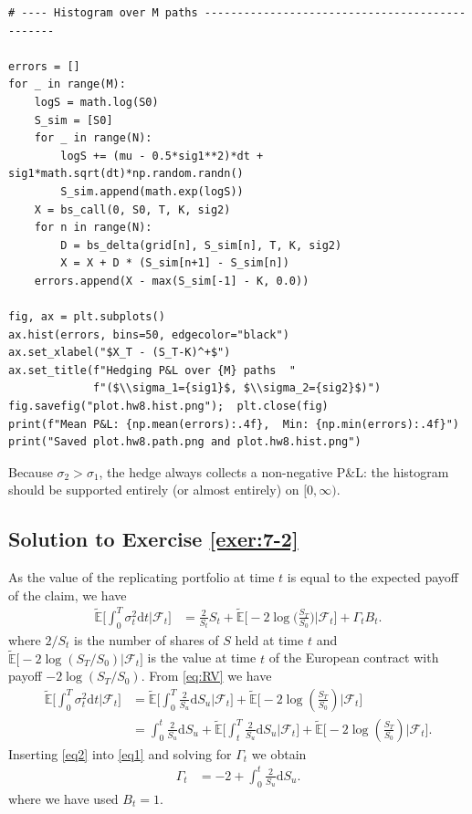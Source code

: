 \documentclass[12pt]{book}
\numberwithin{equation}{chapter}
\theoremstyle{plain}
\numberwithin{theorem}{section}
\theoremstyle{definition}
\numberwithin{exercise}{chapter}
\newcommand{\<}{\langle}
\renewcommand{\>}{\rangle}
\renewcommand{\(}{\left(}
\renewcommand{\)}{\right)}
\renewcommand{\[}{\left[}
\renewcommand{\]}{\right]}
\newcommand\Eb{\mathds{E}}
\newcommand\Fc{\mathscr{F}}
\newcommand\sig{\sigma}
\newcommand\Gam{\Gamma}
\newcommand\Ebt{\widetilde{\Eb}}
\newcommand\dd{\mathrm{d}}
\theoremstyle{definition}
\numberwithin{question}{section}
\begin{document}
\begin{lstlisting}[caption={Delta-hedging with mis-specified volatility (\texttt{hw8.py})}]
# ---- Histogram over M paths -----------------------------------------------

errors = []
for _ in range(M):
    logS = math.log(S0)
    S_sim = [S0]
    for _ in range(N):
        logS += (mu - 0.5*sig1**2)*dt + sig1*math.sqrt(dt)*np.random.randn()
        S_sim.append(math.exp(logS))
    X = bs_call(0, S0, T, K, sig2)
    for n in range(N):
        D = bs_delta(grid[n], S_sim[n], T, K, sig2)
        X = X + D * (S_sim[n+1] - S_sim[n])
    errors.append(X - max(S_sim[-1] - K, 0.0))

fig, ax = plt.subplots()
ax.hist(errors, bins=50, edgecolor="black")
ax.set_xlabel("$X_T - (S_T-K)^+$")
ax.set_title(f"Hedging P&L over {M} paths  "
             f"($\\sigma_1={sig1}$, $\\sigma_2={sig2}$)")
fig.savefig("plot.hw8.hist.png");  plt.close(fig)
print(f"Mean P&L: {np.mean(errors):.4f},  Min: {np.min(errors):.4f}")
print("Saved plot.hw8.path.png and plot.hw8.hist.png")
\end{lstlisting}

\noindent
Because $\sig_2 > \sig_1$, the hedge always collects a non-negative P\&L: the histogram should be supported entirely (or almost entirely) on $[0,\infty)$.


\subsection*{Solution to Exercise \ref{exer:7-2}}
As the value of the replicating portfolio at time $t$ is equal to the expected payoff of the claim, we have
\begin{align}
\Ebt \Big[ \int_0^T \sig_t^2 \dd t \big| \Fc_t \Big]
	&=	\frac{2}{S_t} S_t + \Ebt \Big[ -2 \log \Big( \frac{S_T}{S_0} \Big)  \big| \Fc_t \Big] + \Gam_t B_t . \label{eq1}
\end{align}
where $2/S_t$ is the number of shares of $S$ held at time $t$ and $\Ebt \Big[ -2 \log ( S_T/S_0 )| \Fc_t]$ is the value at time $t$ of the European contract with payoff $-2 \log (S_T/S_0)$.  From \eqref{eq:RV} we have
\begin{align}
\Ebt \Big[ \int_0^T \sig_t^2 \dd t \big| \Fc_t \Big]
	&=	\Ebt \Big[ \int_0^T \frac{2}{S_u} \dd S_u \big| \Fc_t \Big] + \Ebt \Big[ - 2 \log \( \frac{S_T}{S_0} \) \big| \Fc_t \Big] \\
	&=	\int_0^t \frac{2}{S_u} \dd S_u+ \Ebt \Big[ \int_t^T \frac{2}{S_u} \dd S_u \big| \Fc_t \Big] + \Ebt \Big[ - 2 \log \( \frac{S_T}{S_0} \) \big| \Fc_t \Big] . \label{eq2}
\end{align}
Inserting \eqref{eq2} into \eqref{eq1} and solving for $\Gam_t$ we obtain
\begin{align}
\Gam_t
	&=	-2 + \int_0^t \frac{2}{S_u} \dd S_u .
\end{align}
where we have used $B_t = 1$.
\end{document}
